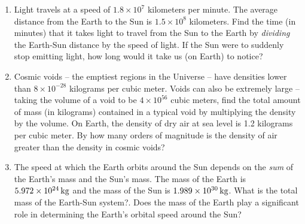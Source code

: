 \documentclass[11pt]{article}
\begin{document}
\begin{enumerate}
    \item Light travels at a speed of $1.8 \times 10^7$ kilometers per minute. The average distance from the Earth to the Sun is $1.5 \times 10^8$ kilometers. Find the time (in minutes) that it takes light to travel from the Sun to the Earth by \emph{dividing} the Earth-Sun distance by the speed of light. If the Sun were to suddenly stop emitting light, how long would it take us (on Earth) to notice? 
    
    \item Cosmic voids -- the emptiest regions in the Universe -- have densities lower than $8 \times 10^{-28}$ kilograms per cubic meter. Voids can also be extremely large -- taking the volume of a void to be $4 \times 10^{56}$ cubic meters, find the total amount of mass (in kilograms) contained in a typical void by multiplying the density by the volume. On Earth, the density of dry air at sea level is 1.2 kilograms per cubic meter. By how many orders of magnitude is the density of air greater than the density in cosmic voids?
    
    \item The speed at which the Earth orbits around the Sun depends on the \emph{sum} of the Earth's mass and the Sun's mass. The mass of the Earth is $5.972 \times 10^{24} \, {\rm kg}$ and the mass of the Sun is $1.989 \times 10^{30} \, {\rm kg}$. What is the total mass of the Earth-Sun system?. Does the mass of the Earth play a significant role in determining the Earth's orbital speed around the Sun?
\end{enumerate}
\end{document}
